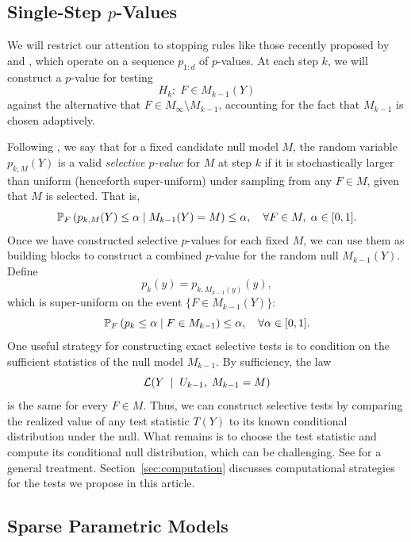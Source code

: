 \documentclass{article}
\begin{document}
\subsection{Single-Step $p$-Values}\label{sec:singleStep}

We will restrict our attention to stopping rules like those recently proposed by \citet{gsell2013sequential} and \citet{li2015accumulation}, which operate on a sequence $p_{1:d}$ of $p$-values. At each step $k$, we will construct a $p$-value for testing
\[
H_{k}:\; F\in M_{k-1}(Y)
\]
against the alternative that $F\in M_\infty\setminus M_{k-1}$, accounting for the fact that $M_{k-1}$ is chosen adaptively.

Following \citet{fithian2014optimal}, we say that for a fixed candidate null model $M$, the random variable $p_{k,M}(Y)$ is a valid {\em selective $p$-value} for $M$ at step $k$ if it is stochastically larger than uniform (henceforth super-uniform) under sampling from any $F\in M$, given that $M$ is selected. That is,
\begin{equation*}
\P_F\left(p_{k,M}(Y) \leq \alpha \mid M_{k-1}(Y) = M\right) 
\leq \alpha, \quad \forall F\in M, \; \alpha \in [0,1].
\end{equation*}
Once we have constructed selective $p$-values for each fixed $M$, we can use them as building blocks to construct a combined $p$-value for the random null $M_{k-1}(Y)$. Define
\[
p_k(y) = p_{k, M_{k-1}(y)}(y),
\]
which is super-uniform on the event $\{F \in M_{k-1}(Y)\}$:
\begin{equation}\label{eq:selectiveGuaranteePk}
\P_F\left(p_k \leq \alpha \mid F\in M_{k-1}\right) \leq \alpha, \quad \forall \alpha \in [0,1].
\end{equation}
One useful strategy for constructing exact selective tests is to condition on the sufficient statistics of the null model $M_{k-1}$. By sufficiency, the law
\[
\L(Y \;\mid\; U_{k-1}, \; M_{k-1}=M)
\]
is the same for every $F\in M$. Thus, we can construct selective tests by comparing the realized value of any test statistic $T(Y)$ to its known conditional distribution under the null. What remains is to choose the test statistic and compute its conditional null distribution, which can be challenging. See \citet{fithian2014optimal} for a general treatment. Section~\ref{sec:computation} discusses computational strategies for the tests we propose in this article.

\subsection{Sparse Parametric Models}\label{sec:genSparse}
\end{document}
